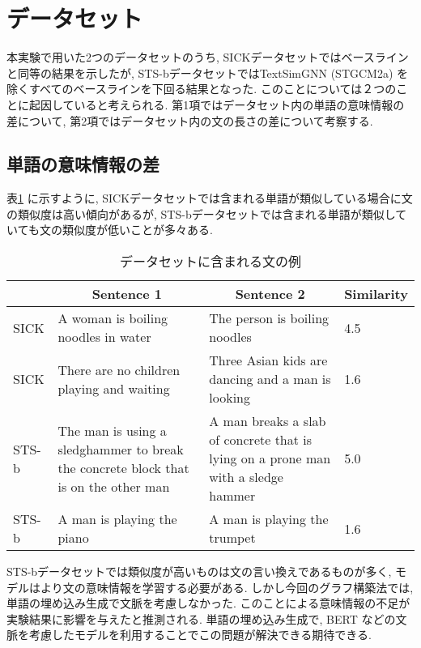 \documentclass[a4j,twoside,12pt]{thesis} %
\begin{document}
\section{データセット}
本実験で用いた2つのデータセットのうち, SICKデータセットではベースラインと同等の結果を示したが, STS-bデータセットではTextSimGNN (STGCM2a) を除くすべてのベースラインを下回る結果となった.
このことについては２つのことに起因していると考えられる. 第1項ではデータセット内の単語の意味情報の差について, 第2項ではデータセット内の文の長さの差について考察する.

\subsection{単語の意味情報の差}
表\ref{table:SICKSTS} に示すように, SICKデータセットでは含まれる単語が類似している場合に文の類似度は高い傾向があるが, STS-bデータセットでは含まれる単語が類似していても文の類似度が低いことが多々ある.
\begin{table}
  \caption{データセットに含まれる文の例}
  \label{table:SICKSTS}
  \begin{center}
  \begin{tabularx}{\linewidth}{l||X|X|X}
    \hline
          & \multicolumn{1}{c|}{Sentence 1} & \multicolumn{1}{c|}{Sentence 2} & \multicolumn{1}{c}{Similarity}  \\
    \hline
    \hline
    SICK &
    A woman is boiling noodles in water &
    The person is boiling noodles &
    4.5\\
    \hline
    SICK &
    There are no children playing and waiting &
    Three Asian kids are dancing and a man is looking &
    1.6\\
    \hline
    STS-b &
    The man is using a sledghammer to break the concrete block that is on the other man &
    A man breaks a slab of concrete that is lying on a prone man with a sledge hammer &
    5.0 \\
    \hline
    STS-b &
    A man is playing the piano &
    A man is playing the trumpet &
    1.6\\
    \hline
  \end{tabularx}
  \end{center}
\end{table}

STS-bデータセットでは類似度が高いものは文の言い換えであるものが多く, モデルはより文の意味情報を学習する必要がある. しかし今回のグラフ構築法では, 単語の埋め込み生成で文脈を考慮しなかった. このことによる意味情報の不足が実験結果に影響を与えたと推測される. 単語の埋め込み生成で, BERT などの文脈を考慮したモデルを利用することでこの問題が解決できる期待できる.
\end{document}
